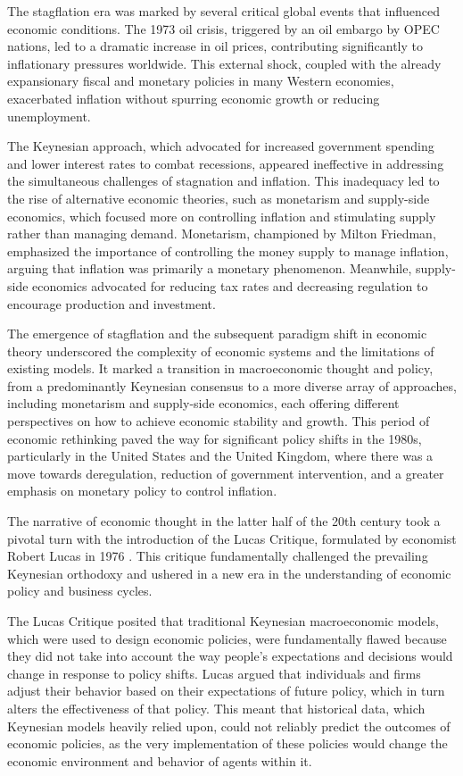 \documentclass[12pt]{article}
\begin{document}
The stagflation era was marked by several critical global events that influenced economic conditions. The 1973 oil
crisis, triggered by an oil embargo by OPEC nations, led to a dramatic increase in oil prices, contributing
significantly to inflationary pressures worldwide. This external shock, coupled with the already expansionary fiscal and
monetary policies in many Western economies, exacerbated inflation without spurring economic growth or reducing
unemployment. 

The Keynesian approach, which advocated for increased government spending and lower interest rates to combat recessions,
appeared ineffective in addressing the simultaneous challenges of stagnation and inflation. This inadequacy led to the
rise of alternative economic theories, such as monetarism and supply-side economics, which focused more on controlling
inflation and stimulating supply rather than managing demand. Monetarism, championed by Milton Friedman, emphasized the
importance of controlling the money supply to manage inflation, arguing that inflation was primarily a monetary
phenomenon\cite{Fri72}. Meanwhile, supply-side economics advocated for reducing tax rates and decreasing regulation to encourage
production and investment. 

The emergence of stagflation and the subsequent paradigm shift in economic theory underscored the complexity of economic
systems and the limitations of existing models. It marked a transition in macroeconomic thought and policy, from a
predominantly Keynesian consensus to a more diverse array of approaches, including monetarism and supply-side economics,
each offering different perspectives on how to achieve economic stability and growth. This period of economic rethinking
paved the way for significant policy shifts in the 1980s, particularly in the United States and the United Kingdom,
where there was a move towards deregulation, reduction of government intervention, and a greater emphasis on monetary
policy to control inflation. 

The narrative of economic thought in the latter half of the 20th century took a pivotal turn with the introduction of
the Lucas Critique, formulated by economist Robert Lucas in 1976 \cite{Luc76}. This critique fundamentally challenged the prevailing
Keynesian orthodoxy and ushered in a new era in the understanding of economic policy and business cycles. 

The Lucas Critique posited that traditional Keynesian macroeconomic models, which were used to design economic policies,
were fundamentally flawed because they did not take into account the way people's expectations and decisions would
change in response to policy shifts. Lucas argued that individuals and firms adjust their behavior based on their
expectations of future policy, which in turn alters the effectiveness of that policy. This meant that historical data,
which Keynesian models heavily relied upon, could not reliably predict the outcomes of economic policies, as the  very
implementation of these policies would change the economic environment and behavior of agents within it.
\end{document}
